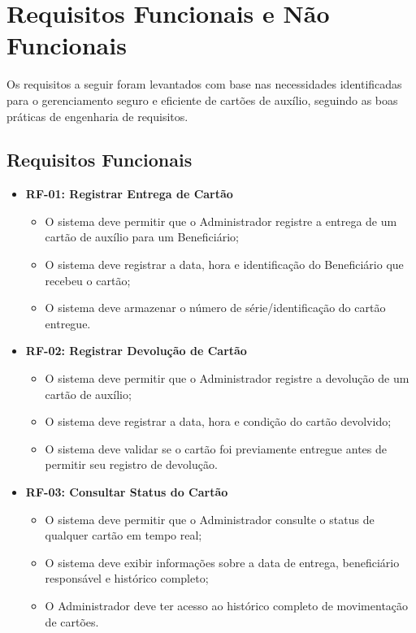 \documentclass[
  article,
  a4paper,
  12pt,
  oneside,
  fleqn
]{abntex2}
\begin{document}
\section{Requisitos Funcionais e Não Funcionais}

Os requisitos a seguir foram levantados com base nas necessidades identificadas para o gerenciamento seguro e eficiente de cartões de auxílio, seguindo as boas práticas de engenharia de requisitos.

\subsection{Requisitos Funcionais}

\begin{itemize}
    \item \textbf{RF-01: Registrar Entrega de Cartão}
    \begin{itemize}
        \item O sistema deve permitir que o Administrador registre a entrega de um cartão de auxílio para um Beneficiário;
        \item O sistema deve registrar a data, hora e identificação do Beneficiário que recebeu o cartão;
        \item O sistema deve armazenar o número de série/identificação do cartão entregue.
    \end{itemize}

    \item \textbf{RF-02: Registrar Devolução de Cartão}
    \begin{itemize}
        \item O sistema deve permitir que o Administrador registre a devolução de um cartão de auxílio;
        \item O sistema deve registrar a data, hora e condição do cartão devolvido;
        \item O sistema deve validar se o cartão foi previamente entregue antes de permitir seu registro de devolução.
    \end{itemize}

    \item \textbf{RF-03: Consultar Status do Cartão}
    \begin{itemize}
        \item O sistema deve permitir que o Administrador consulte o status de qualquer cartão em tempo real;
        \item O sistema deve exibir informações sobre a data de entrega, beneficiário responsável e histórico completo;
        \item O Administrador deve ter acesso ao histórico completo de movimentação de cartões.
    \end{itemize}


\end{itemize}
\end{document}

